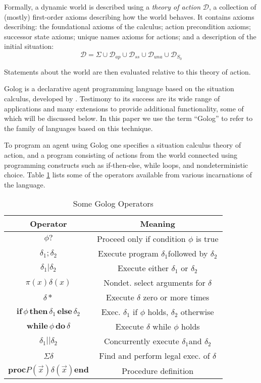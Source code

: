 \documentclass{llncs}
\begin{document}
Formally, a dynamic world is described using a \emph{theory of action}
$\mathcal{D}$, a collection of (mostly) first-order axioms describing
how the world behaves. It contains axioms describing: the foundational
axioms of the calculus; action precondition axioms; successor state
axioms; unique names axioms for actions; and a description of the
initial situation:
\begin{equation}
\label{eqn:sc_action_theory}
\mathcal{D}=\Sigma\cup\mathcal{D}_{ap}\cup\mathcal{D}_{ss}\cup\mathcal{D}_{una}\cup\mathcal{D}_{S_{0}}
\end{equation}

Statements about the world are then evaluated relative to this theory
of action.

Golog is a declarative agent programming language based on the situation
calculus, developed by \cite{levesque97golog}. Testimony
to its success are its wide range of applications and many extensions
to provide additional functionality, some of which will be discussed below.
In this paper we use the term ``Golog'' to refer to the family
of languages based on this technique.

To program an agent using Golog one specifies a situation calculus
theory of action, and a program consisting of actions from the world
connected using programming constructs such as if-then-else, while
loops, and nondeterministic choice. Table \ref{tbl:Golog-Operators}
lists some of the operators available from various incarnations of
the language.

\begin{table}[t]
\begin{center}\begin{tabular}{|c|c|}
\hline 
Operator&
Meaning\tabularnewline
\hline
\hline 
$\phi?$&
Proceed only if condition $\phi$ is true\tabularnewline
\hline 
$\delta_{1};\delta_{2}$&
Execute program $\delta_{1}$followed by $\delta_{2}$\tabularnewline
\hline 
$\delta_{1}|\delta_{2}$&
Execute either $\delta_{1}$ or $\delta_{2}$\tabularnewline
\hline 
$\pi(x)\delta(x)$&
Nondet. select arguments for $\delta$\tabularnewline
\hline 
$\delta*$&
Execute $\delta$ zero or more times\tabularnewline
\hline 
$\mathbf{if}\,\phi\,\mathbf{then}\,\delta_{1}\,\mathbf{else}\,\delta_{2}$&
Exec. $\delta_{1}$ if $\phi$ holds, $\delta_{2}$ otherwise\tabularnewline
\hline 
$\mathbf{while\,}\phi\mathbf{\, do}\,\delta$&
Execute $\delta$ while $\phi$ holds\tabularnewline
\hline 
$\delta_{1}||\delta_{2}$&
Concurrently execute $\delta_{1}$and $\delta_{2}$\tabularnewline
\hline 
$\Sigma\delta$&
Find and perform legal exec. of $\delta$\tabularnewline
\hline 
$\mathbf{proc}P(\overrightarrow{x})\delta(\overrightarrow{x})\mathbf{end}$&
Procedure definition\tabularnewline
\hline
\end{tabular}\end{center}


\caption{Some Golog Operators\label{tbl:Golog-Operators}}
\end{table}
\end{document}
